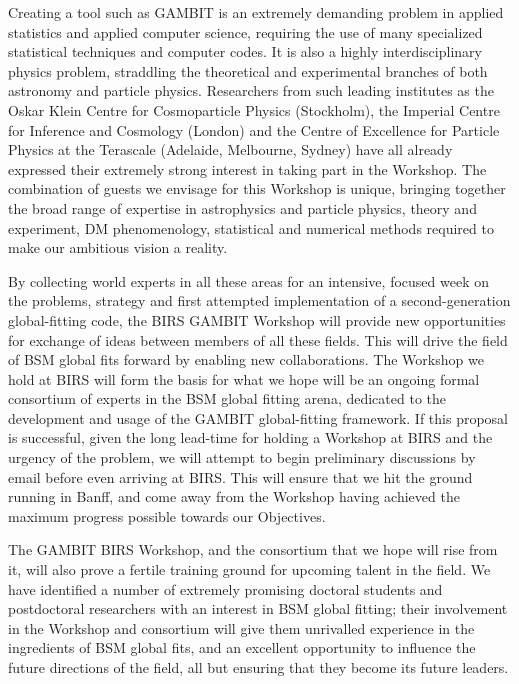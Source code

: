 \documentclass[a4paper,11pt]{article}
\begin{document}
Creating a tool such as GAMBIT is an extremely demanding problem in applied statistics and applied computer science, requiring the use of many specialized statistical techniques and computer codes.  It is also a highly interdisciplinary physics problem, straddling the theoretical and experimental branches of both astronomy and particle physics.  Researchers from such leading institutes as the Oskar Klein Centre for Cosmoparticle Physics (Stockholm), the Imperial Centre for Inference and Cosmology (London) and the Centre of Excellence for Particle Physics at the Terascale (Adelaide, Melbourne, Sydney) have all already expressed their extremely strong interest in taking part in the Workshop.  The combination of guests we envisage for this Workshop is unique, bringing together the broad range of expertise in astrophysics and particle physics, theory and experiment, DM phenomenology, statistical and numerical methods required to make our ambitious vision a reality.

By collecting world experts in all these areas for an intensive, focused week on the problems, strategy and first attempted implementation of a second-generation global-fitting code, the BIRS GAMBIT Workshop will provide new opportunities for exchange of ideas between members of all these fields.  This will drive the field of BSM global fits forward by enabling new collaborations.  The Workshop we hold at BIRS will form the basis for what we hope will be an ongoing formal consortium of experts in the BSM global fitting arena, dedicated to the development and usage of the GAMBIT global-fitting framework.  If this proposal is successful, given the long lead-time for holding a Workshop at BIRS and the urgency of the problem, we will attempt to begin preliminary discussions by email before even arriving at BIRS.  This will ensure that we hit the ground running in Banff, and come away from the Workshop having achieved the maximum progress possible towards our Objectives.

The GAMBIT BIRS Workshop, and the consortium that we hope will rise from it, will also prove a fertile training ground for upcoming talent in the field.  We have identified a number of extremely promising doctoral students and postdoctoral researchers with an interest in BSM global fitting; their involvement in the Workshop and consortium will give them unrivalled experience in the ingredients of BSM global fits, and an excellent opportunity to influence the future directions of the field, all but ensuring that they become its future leaders.
\end{document}
